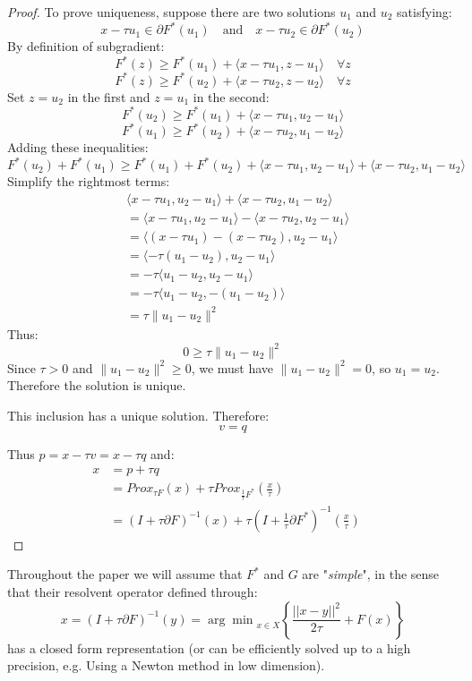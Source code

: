 \documentclass[twoside,12pt,openright]{report}  %
\begin{document}
\begin{proof}
To prove uniqueness, suppose there are two solutions $u_1$ and $u_2$ satisfying:
\[
x - \tau u_1 \in \partial F^*(u_1) \quad \text{and} \quad x - \tau u_2 \in \partial F^*(u_2)
\]
By definition of subgradient:
\[
F^*(z) \geq F^*(u_1) + \langle x - \tau u_1, z - u_1 \rangle \quad \forall z
\]
\[
F^*(z) \geq F^*(u_2) + \langle x - \tau u_2, z - u_2 \rangle \quad \forall z
\]
Set $z = u_2$ in the first and $z = u_1$ in the second:
\[
F^*(u_2) \geq F^*(u_1) + \langle x - \tau u_1, u_2 - u_1 \rangle
\]
\[
F^*(u_1) \geq F^*(u_2) + \langle x - \tau u_2, u_1 - u_2 \rangle
\]
Adding these inequalities:
\[
F^*(u_2) + F^*(u_1) \geq F^*(u_1) + F^*(u_2) + \langle x - \tau u_1, u_2 - u_1 \rangle + \langle x - \tau u_2, u_1 - u_2 \rangle
\]
Simplify the rightmost terms:
\[
\begin{aligned}
&\langle x - \tau u_1, u_2 - u_1 \rangle + \langle x - \tau u_2, u_1 - u_2 \rangle \\
&= \langle x - \tau u_1, u_2 - u_1 \rangle - \langle x - \tau u_2, u_2 - u_1 \rangle \\
&= \langle (x - \tau u_1) - (x - \tau u_2), u_2 - u_1 \rangle \\
&= \langle -\tau(u_1 - u_2), u_2 - u_1 \rangle \\
&= -\tau \langle u_1 - u_2, u_2 - u_1 \rangle \\
&= -\tau \langle u_1 - u_2, -(u_1 - u_2) \rangle \\
&= \tau \| u_1 - u_2 \|^2
\end{aligned}
\]
Thus:
\[
0 \geq \tau \| u_1 - u_2 \|^2
\]
Since $\tau > 0$ and $\| u_1 - u_2 \|^2 \geq 0$, we must have $\| u_1 - u_2 \|^2 = 0$, so $u_1 = u_2$. Therefore the solution is unique.

This inclusion has a unique solution. Therefore:
\[
v = q
\]

Thus \(p = x - \tau v = x - \tau q\) and:
\[
\begin{aligned} 
x &= p + \tau q\\
&= Prox_{\tau F}(x) + \tau Prox_{\frac{1}{\tau}F^*}\left(\frac{x}{\tau}\right) \\
&= (I + \tau \partial F)^{-1}(x) + \tau\left(I + \frac{1}{\tau} \partial F^*\right)^{-1}\left(\frac{x}{\tau}\right) \quad 
\end{aligned}
\]
\end{proof}
Throughout the paper we will assume that \(F^*\) and \(G\)  are "\emph{simple}", in the sense that their resolvent operator defined through:
\[
x = (I + \tau\partial F)^{-1}(y) = {\arg \min}_{x \in X}{ \left\{ \frac{||x-y||^2}{2\tau} + F(x) \right\}}
 \]
has a closed form representation (or can be efficiently solved up to a high precision, e.g. Using a Newton method in low dimension). 
\end{document}
